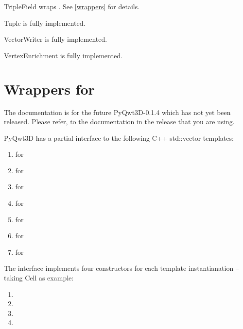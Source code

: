 \documentclass{manual}
\newcommand{\Future}{
  \begin{notice}[warning]
    The documentation is for the future PyQwt3D-0.1.4 which has not yet been
    released.  Please refer, to the documentation in the release that you are
    using.
  \end{notice}
}
\begin{document}
\begin{classdesc*}{TripleField}
wraps . See \ref{wrappers} for details.
\end{classdesc*}

\begin{classdesc*}{Tuple}
is fully implemented.
\end{classdesc*}

\begin{classdesc*}{VectorWriter}
is fully implemented.
\end{classdesc*}

\begin{classdesc*}{VertexEnrichment}
is fully implemented.
\end{classdesc*}

\section{Wrappers for  \label{wrappers}}

\Future{}

PyQwt3D has a partial interface to the following C++ std::vector templates:
\begin{enumerate}
\item
   for 
\item
   for 
\item
   for 
\item
   for 
\item
   for 
\item
   for 
\item
   for 
\end{enumerate}

The interface implements four constructors for each template instantianation --
taking Cell as example:
\begin{enumerate}
\item
\item
\item
\item
\end{enumerate}
\end{document}
